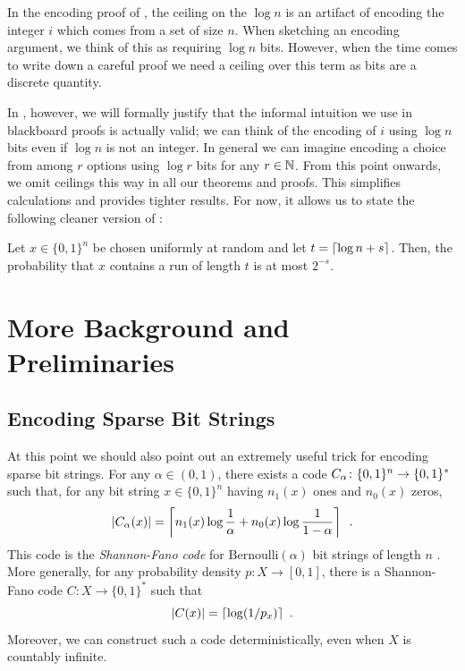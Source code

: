 \documentclass[format=acmsmall, review=false, screen=true]{acmart}
\newenvironment{customthm}[1]
  {\renewcommand\theinnercustomthm{#1}\innercustomthm}
  {\endinnercustomthm}
\begin{document}
In the encoding proof of , the ceiling on the
$\log n$ is an artifact of encoding the integer $i$ which comes
from a set of size $n$. When sketching an encoding argument, we
think of this as requiring $\log n$ bits. However, when 
the time comes to write down a
careful proof we need a ceiling over this term as bits are a discrete
quantity.

In , however, we will 
formally justify that the informal
intuition we use in blackboard proofs is actually valid; we can think
of the encoding of $i$ using $\log n$ bits even if $\log n$ is not an
integer.  In general we can imagine encoding a choice from among $r$
options using $\log r$ bits for any $r\in\mathbb{N}$.  From this point
onwards, we omit ceilings this way in all our theorems and
proofs. This simplifies calculations and provides tighter results.
For now, it allows us to state the following cleaner version of
:

\begin{customthm}{\ref*{thm:runs-i}b}
  Let $x\in\{0,1\}^n$ be chosen uniformly at random and let
  $t = {\lceil \log n + s \rceil}$. Then, the probability that $x$ contains a
  run of length $t$ is at most $2^{-s}$.
\end{customthm}


\section{More Background and Preliminaries}
\subsection{Encoding Sparse Bit Strings}

At this point we should also point out an extremely useful trick 
for encoding sparse bit strings. For any $\alpha\in(0,1)$,
there exists a code $C_\alpha\colon \{0,1\}^n\rightarrow \{0,1\}^*$
such that, for any bit string $x\in\{0,1\}^n$ having $n_1(x)$ ones and
$n_0(x)$ zeros,
\begin{equation}
  |C_\alpha(x)| = \left\lceil n_1(x)\log \frac{1}{\alpha} + 
    n_0(x)\log\frac{1}{1-\alpha} \right\rceil \enspace.
  \eqlabel{sparse-bitstring-i}
\end{equation}
This code is the \emph{Shannon-Fano code}
for $\mathrm{Bernoulli}(\alpha)$ bit strings of length $n$
\cite{fano:transmission,shannon:mathematical}. 
More generally, for any probability density $p : X \to [0, 1]$,
there is a Shannon-Fano code $C : X \to \{0, 1\}^*$ 
such that
\[
  |C(x)| = {\lceil \log (1/p_x) \rceil} \enspace .
\]
Moreover, we can construct such a code deterministically, even when
$X$ is countably infinite.
\end{document}
